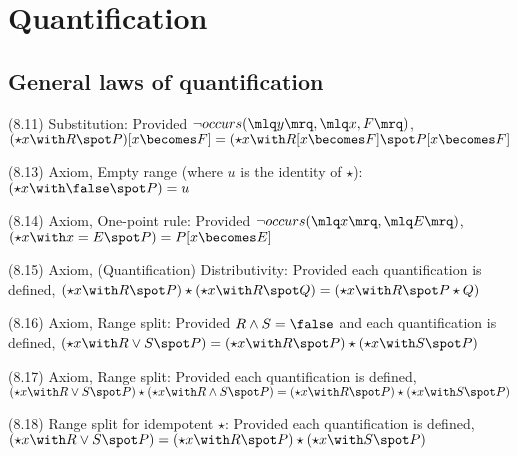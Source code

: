 \documentclass[a4paper,10pt]{article}
\newenvironment{theoremlist}{
\begin{description}
  \setlength{\itemsep}{1.5pt}
  \setlength{\parskip}{0pt}
  \setlength{\parsep}{0pt}
}{\end{description}}
\begin{document}
\section{Quantification}
\subsection{General laws of quantification}

\begin{theoremlist}
\item[(8.11) Substitution:]							Provided $ \lnot occurs(\mlq y \mrq,\mlq x,F \mrq) $,\newline
										$ (\star x \with R \spot P)[x \becomes F] = (\star x \with R[x \becomes F] \spot P[x \becomes F] $
										
\item[(8.13) Axiom, Empty range (where $u$ is the identity of $\star$):]	$ (\star x \with \false \spot P) = u $

\item[(8.14) Axiom, One-point rule:]						Provided $ \lnot occurs(\mlq x \mrq, \mlq E \mrq) $,\newline
										$ (\star x \with x = E \spot P) = P[x \becomes E] $

\item[(8.15) Axiom, (Quantification) Distributivity:]				Provided each quantification is defined,\newline
										$ (\star x \with R \spot P) \star (\star x \with R \spot Q) = (\star x \with R \spot P \star Q) $

\item[(8.16) Axiom, Range split:]						Provided $ R \land S = \false $ and each quantification is defined,\newline
										$ (\star x \with R \lor S \spot P) = (\star x \with R \spot P) \star (\star x \with S \spot P) $

\item[(8.17) Axiom, Range split:]						Provided each quantification is defined,\newline
										$ (\star x \with R \lor S \spot P) \star (\star x \with R \land S \spot P) = (\star x \with R \spot P) \star (\star x \with S \spot P) $

\item[(8.18) Range split for idempotent $\star$:]				Provided each quantification is defined,\newline
										$ (\star x \with R \lor S \spot P) = (\star x \with R \spot P) \star (\star x \with S \spot P) $


\end{theoremlist}
\end{document}
